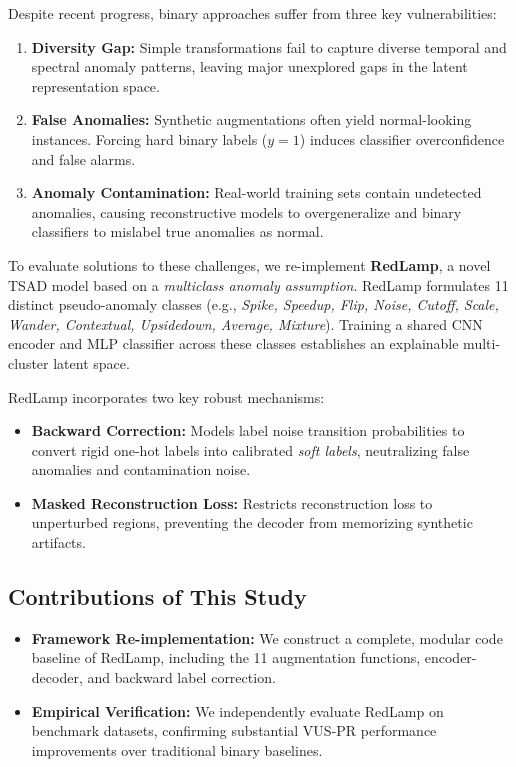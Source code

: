 \documentclass[sigconf,nonacm]{acmart}
\begin{document}
Despite recent progress, binary approaches suffer from three key vulnerabilities:
\begin{enumerate}
    \item \textbf{Diversity Gap:} Simple transformations fail to capture diverse temporal and spectral anomaly patterns, leaving major unexplored gaps in the latent representation space.
    \item \textbf{False Anomalies:} Synthetic augmentations often yield normal-looking instances. Forcing hard binary labels ($y=1$) induces classifier overconfidence and false alarms.
    \item \textbf{Anomaly Contamination:} Real-world training sets contain undetected anomalies, causing reconstructive models to overgeneralize and binary classifiers to mislabel true anomalies as normal.
\end{enumerate}

To evaluate solutions to these challenges, we re-implement \textbf{RedLamp}, a novel TSAD model based on a \textit{multiclass anomaly assumption}. RedLamp formulates 11 distinct pseudo-anomaly classes (e.g., \textit{Spike, Speedup, Flip, Noise, Cutoff, Scale, Wander, Contextual, Upsidedown, Average, Mixture}). Training a shared CNN encoder and MLP classifier across these classes establishes an explainable multi-cluster latent space.

RedLamp incorporates two key robust mechanisms:
\begin{itemize}
    \item \textbf{Backward Correction:} Models label noise transition probabilities to convert rigid one-hot labels into calibrated \textit{soft labels}, neutralizing false anomalies and contamination noise.
    \item \textbf{Masked Reconstruction Loss:} Restricts reconstruction loss to unperturbed regions, preventing the decoder from memorizing synthetic artifacts.
\end{itemize}

\subsection*{Contributions of This Study}
\begin{itemize}
    \item \textbf{Framework Re-implementation:} We construct a complete, modular code baseline of RedLamp, including the 11 augmentation functions, encoder-decoder, and backward label correction.
    \item \textbf{Empirical Verification:} We independently evaluate RedLamp on benchmark datasets, confirming substantial VUS-PR performance improvements over traditional binary baselines.
\end{itemize}
\end{document}
